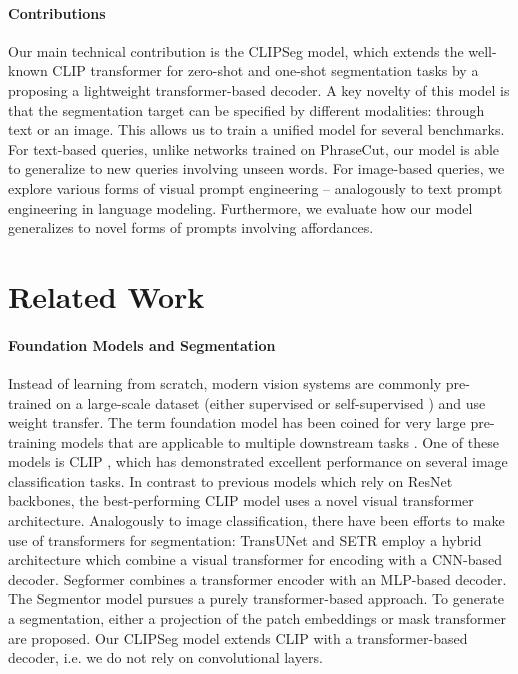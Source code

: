 \paragraph{Contributions}

Our main technical contribution is the CLIPSeg model, which extends the well-known CLIP transformer for zero-shot and one-shot segmentation tasks by a proposing a lightweight transformer-based decoder. A key novelty of this model is that the segmentation target can be specified by different modalities: through text or an image. 
This allows us to train a unified model for several benchmarks. 
For text-based queries, unlike networks trained on PhraseCut, our model is able to generalize to new queries involving unseen words. For image-based queries, we explore various forms of visual prompt engineering -- analogously to text prompt engineering in language modeling.
Furthermore, we evaluate how our model generalizes to novel forms of prompts involving affordances.

\section{Related Work}

\paragraph{Foundation Models and Segmentation}

Instead of learning from scratch, modern vision systems are commonly pre-trained on a large-scale dataset (either supervised \cite{imagenet} or self-supervised \cite{chen20, chen21}) and use weight transfer. The term foundation model has been coined for very large pre-training models that are applicable to multiple downstream tasks \cite{bommasani21foundation}. One of these models is CLIP \cite{radford20}, which has demonstrated excellent performance on several image classification tasks. In contrast to previous models which rely on ResNet \cite{he16} backbones, the best-performing CLIP model uses a novel visual transformer \cite{dosovitskiy20} architecture.
Analogously to image classification, there have been efforts to make use of transformers for segmentation: 
\mbox{TransUNet} \cite{chen21transunet} and SETR \cite{zheng21setr} employ a hybrid architecture which combine a visual transformer for encoding with a CNN-based decoder.
Segformer \cite{xie21segformer} combines a transformer encoder with an MLP-based decoder.
The Segmentor model \cite{strudel21segmenter} pursues a purely transformer-based approach. To generate a segmentation, either a projection of the patch embeddings or mask transformer are proposed. 
Our CLIPSeg model extends CLIP with a transformer-based decoder, i.e. we do not rely on convolutional layers.

